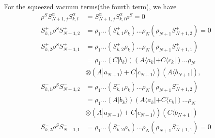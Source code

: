 \documentclass[aps,showpacs,twocolumn,twoside,groupedaddress]{revtex4}
\begin{document}
For the squeezed vacuum terms(the fourth term), we have
\begin{equation}
\label{eq9}
\begin{split}
\rho^{S}S_{N+1,j}^{\alpha}S_{k,l}^{\alpha}&=S_{N+1,j}^{\alpha}S_{k,l}^{\alpha}\rho^{S}=0\\
S_{k,1}^{+}\rho^{S}S_{N+1,2}^{+}&=\rho_{1}...(S_{k,1}^{+}\rho_{k})...\rho_{N}(\rho_{N+1}S_{N+1,2}^{+})=0\\
S_{k,2}^{+}\rho^{S}S_{N+1,1}^{+}&=\rho_{1}...(S_{k,2}^{+}\rho_{k})...\rho_{N}(\rho_{N+1}S_{N+1,1}^{+})\\
&=\rho_{1}...(C|b_{k}\rangle)(A\langle a_{k}|+C\langle c_{k}|)...\rho_{N}\\
&\otimes(A|a_{N+1}\rangle+C|c_{N+1}\rangle)(A\langle b_{N+1}|),\\
S_{k,1}^{-}\rho^{S}S_{N+1,2}^{-}&=\rho_{1}...(S_{k,1}^{-}\rho_{k})...\rho_{N}(\rho_{N+1}S_{N+1,2}^{-})\\
&=\rho_{1}...(A|b_{k}\rangle)(A\langle a_{k}|+C\langle c_{k}|)...\rho_{N}\\
&\otimes(A|a_{N+1}\rangle+C|c_{N+1}\rangle)(C\langle b_{N+1}|)\\
S_{k,2}^{-}\rho^{S}S_{N+1,1}^{-}&=\rho_{1}...(S_{k,2}^{-}\rho_{k})...\rho_{N}(\rho_{N+1}S_{N+1,1}^{-})=0\\
\end{split}
\end{equation}
\end{document}
